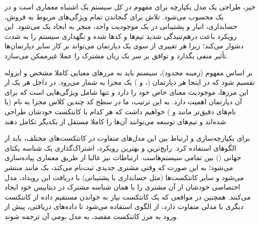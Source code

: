 خیر، طراحی یک مدل یکپارچه برای مفهوم  در کل سیستم یک اشتباه معماری است و در  یک  محسوب می‌شود. تلاش برای گنجاندن تمام ویژگی‌های مربوط به فروش، حسابداری، انبار و پشتیبانی در یک موجودیت واحد، منجر به ایجاد یک  می‌شود. این رویکرد باعث درهم‌تنیدگی شدید تیم‌ها و کدها شده و نگهداری سیستم را به شدت دشوار می‌کند؛ زیرا هر تغییری از سوی یک دپارتمان می‌تواند بر کار سایر دپارتمان‌ها تأثیر منفی بگذارد و توافق بر سر یک زبان مشترک را عملا غیرممکن می‌سازد.

بر اساس مفهوم  (زمینه محدود)، سیستم باید به مرزهای معنایی کاملا مشخص و ایزوله تقسیم شود که در اینجا هر دپارتمان (،  و ) یک  مجزا به شمار می‌رود. در داخل هر یک از این مرزها، موجودیت  معنای خاص خود را دارد و تنها شامل ویژگی‌هایی است که برای آن دپارتمان اهمیت دارد. به این ترتیب، ما در سطح کد چندین کلاس مجزا به نام  (یا نام‌های دقیق‌تر مانند  و ) خواهیم داشت که هر کدام با  کانتکست خودشان طراحی شده‌اند و تیم‌های توسعه می‌توانند آن‌ها را کاملا مستقل از یکدیگر تکامل دهند.

برای یکپارچه‌سازی و ارتباط بین این مدل‌های متفاوت در کانتکست‌های مختلف، باید از الگوهای  استفاده کرد. رایج‌ترین و بهترین رویکرد، اشتراک‌گذاری یک شناسه یکتای جهانی () بین تمامی سیستم‌هاست. ارتباطات نیز غالبا از طریق معماری  پیاده‌سازی می‌شود؛ به این صورت که وقتی مشتری جدیدی ثبت‌نام می‌کند، یک  مانند  منتشر می‌شود و سایر کانتکست‌ها (مثل حسابداری یا پشتیبانی) با دریافت این رویداد، مدل اختصاصی خودشان از آن مشتری را با همان شناسه مشترک در دیتابیس خود ایجاد می‌کنند. همچنین در مواقعی که یک کانتکست نیاز به خواندن مستقیم داده از کانتکست دیگری با مدلی متفاوت دارد، از الگوی  استفاده می‌شود تا داده‌های دریافتی، پیش از ورود به مرز کانتکست مقصد، به مدل بومی آن ترجمه شوند.